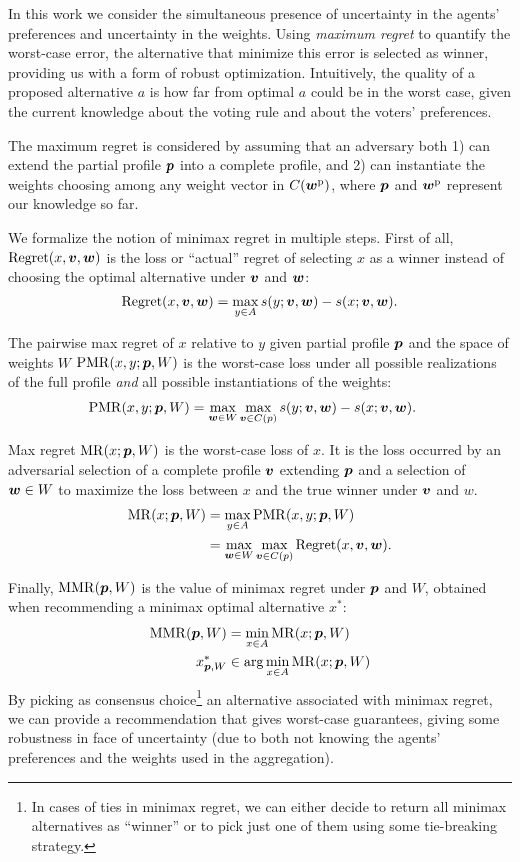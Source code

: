In this work we consider the simultaneous presence of uncertainty in the agents' preferences and uncertainty in the weights.
Using {\em maximum regret} to quantify the worst-case error, the alternative that minimize this error is selected as winner, providing us with a form of robust optimization.
Intuitively, the quality of a proposed alternative $a$ is how far from optimal $a$  could be in the worst case, given the current knowledge about the voting rule and about the voters' preferences.

The maximum regret is considered by assuming that an adversary both 1) can extend the partial profile $\bm{p}$ into a complete profile, and 2) can instantiate the weights choosing among any weight vector in $C(\bm{w}^\text{p})$, where $\bm{p}$ and $\bm{w}^\text{p}$ represent our knowledge so far.

We formalize the notion of minimax regret in multiple steps.
First of all, $\operatorname{Regret}(x, \bm{v}, \bm{w})$ is the loss or ``actual'' regret  of selecting $x$ as a winner instead of choosing the optimal alternative under $\bm{v}$ and $\bm{w}$:
\[\operatorname{Regret}(x, \bm{v}, \bm{w}) = \max_{y \in A} s(y; \bm{v},\bm{w}) - s(x; \bm{v}, \bm{w}).\]

The pairwise max regret of $x$ relative to $y$ given partial profile $\bm{p}$ and the space of weights $W$
$\operatorname{PMR}(x,y;\bm{p},W)$ is the worst-case loss under all possible realizations of the full profile {\em and} all possible instantiations of the weights:
\begin{align}
\operatorname{PMR}(x,y; \bm{p}, W) & = \max_{\bm{w} \in W} \max_{\bm{v} \in C(p)} s(y; \bm{v},\bm{w}) - s(x; \bm{v},\bm{w}).
\end{align}

Max regret $\operatorname{MR}(x;\bm{p},W)$ is the worst-case loss of $x$. It is the loss occurred by an adversarial selection of a complete profile $\bm{v}$ extending $\bm{p}$ and a selection of $\bm{w} \in W$ to maximize the loss between $x$ and the true winner under $\bm{v}$ and $w$.
\begin{align}
\operatorname{MR}(x; \bm{p}, W) & = \max_{y \in A} \operatorname{PMR}(x,y; \bm{p}, W)\\
& = \max_{\bm{w} \in W} \max_{\bm{v} \in C(p)} \operatorname{Regret}(x, \bm{v}, \bm{w}).
\end{align}

Finally,  $\operatorname{MMR}(\bm{p},W)$ is the value of minimax regret under $\bm{p}$ and $W$, obtained when recommending a minimax optimal alternative $x^*$:
\begin{align*}
\operatorname{MMR}(\bm{p},W) & = \min_{x \in A} \operatorname{MR}(x;\bm{p},W) \\
x^{*}_{\bm{p},W} & \in \arg\min_{x \in A} \operatorname{MR}(x;\bm{p},W) 
\end{align*}
By picking as consensus choice\footnote{In cases of ties in minimax regret, we can either decide to return all minimax alternatives as ``winner'' or to pick just one of them using some tie-breaking strategy.} an alternative associated with minimax regret, we can provide a recommendation that gives worst-case guarantees, giving some robustness in face of uncertainty (due to both not knowing the agents' preferences and the weights used in the aggregation). 

